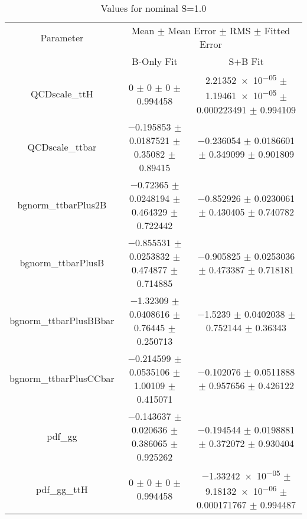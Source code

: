 \begin{table}
\centering
\caption{Values for nominal S=1.0}
\begin{tabular}{ccc}
\toprule
Parameter & \multicolumn{2}{c}{Mean $\pm$ Mean Error $\pm$ RMS $\pm$ Fitted Error}\\
 & B-Only Fit & S+B Fit\\
\midrule
QCDscale\_ttH & \num{0} $\pm$ \num{0} $\pm$ \num{0} $\pm$ \num{0.994458} & \num{2.21352e-05} $\pm$ \num{1.19461e-05} $\pm$ \num{0.000223491} $\pm$ \num{0.994109}\\
QCDscale\_ttbar & \num{-0.195853} $\pm$ \num{0.0187521} $\pm$ \num{0.35082} $\pm$ \num{0.89415} & \num{-0.236054} $\pm$ \num{0.0186601} $\pm$ \num{0.349099} $\pm$ \num{0.901809}\\
bgnorm\_ttbarPlus2B & \num{-0.72365} $\pm$ \num{0.0248194} $\pm$ \num{0.464329} $\pm$ \num{0.722442} & \num{-0.852926} $\pm$ \num{0.0230061} $\pm$ \num{0.430405} $\pm$ \num{0.740782}\\
bgnorm\_ttbarPlusB & \num{-0.855531} $\pm$ \num{0.0253832} $\pm$ \num{0.474877} $\pm$ \num{0.714885} & \num{-0.905825} $\pm$ \num{0.0253036} $\pm$ \num{0.473387} $\pm$ \num{0.718181}\\
bgnorm\_ttbarPlusBBbar & \num{-1.32309} $\pm$ \num{0.0408616} $\pm$ \num{0.76445} $\pm$ \num{0.250713} & \num{-1.5239} $\pm$ \num{0.0402038} $\pm$ \num{0.752144} $\pm$ \num{0.36343}\\
bgnorm\_ttbarPlusCCbar & \num{-0.214599} $\pm$ \num{0.0535106} $\pm$ \num{1.00109} $\pm$ \num{0.415071} & \num{-0.102076} $\pm$ \num{0.0511888} $\pm$ \num{0.957656} $\pm$ \num{0.426122}\\
pdf\_gg & \num{-0.143637} $\pm$ \num{0.020636} $\pm$ \num{0.386065} $\pm$ \num{0.925262} & \num{-0.194544} $\pm$ \num{0.0198881} $\pm$ \num{0.372072} $\pm$ \num{0.930404}\\
pdf\_gg\_ttH & \num{0} $\pm$ \num{0} $\pm$ \num{0} $\pm$ \num{0.994458} & \num{-1.33242e-05} $\pm$ \num{9.18132e-06} $\pm$ \num{0.000171767} $\pm$ \num{0.994487}\\
\bottomrule
\end{tabular}
\end{table}